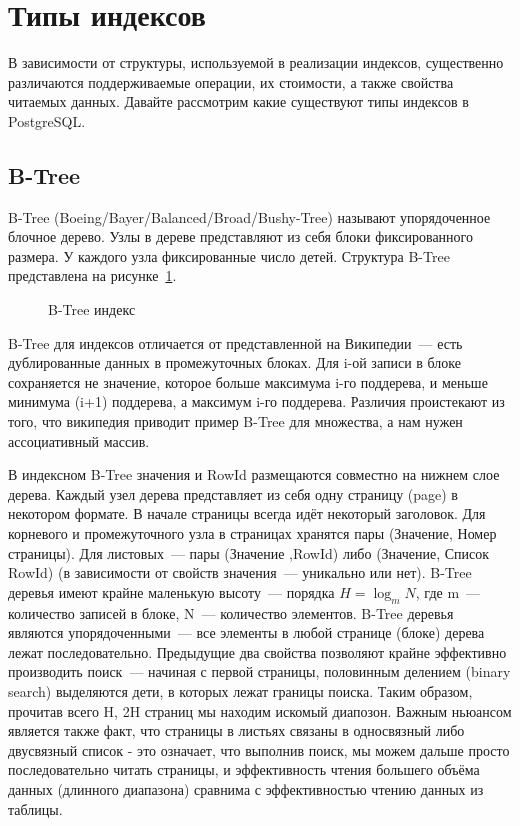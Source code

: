 \section{Типы индексов}

В зависимости от структуры, используемой в реализации индексов, существенно различаются поддерживаемые операции, их стоимости, а также свойства читаемых данных. Давайте рассмотрим какие существуют типы индексов в PostgreSQL.




\subsection{B-Tree}

B-Tree (Boeing/Bayer/Balanced/Broad/Bushy-Tree) называют упорядоченное блочное дерево. Узлы в дереве представляют из себя блоки фиксированного размера. У каждого узла фиксированные число детей. Структура B-Tree представлена на рисунке~\ref{fig:btree_index}.

\begin{figure}[ht!]
  \caption{B-Tree индекс}
  \label{fig:btree_index}
\end{figure}

B-Tree для индексов отличается от представленной на Википедии~--- есть дублированные данных в промежуточных блоках. Для i-ой записи в блоке сохраняется не значение, которое больше максимума i-го поддерева, и меньше минимума (i+1) поддерева, а максимум i-го поддерева. Различия проистекают из того, что википедия приводит пример B-Tree для множества, а нам нужен ассоциативный массив.

В индексном B-Tree значения и RowId размещаются совместно на нижнем слое дерева. Каждый узел дерева представляет из себя одну страницу (page) в некотором формате. В начале страницы всегда идёт некоторый заголовок. Для корневого и промежуточного узла в страницах хранятся пары (Значение, Номер страницы). Для листовых~--- пары (Значение ,RowId) либо (Значение, Список RowId) (в зависимости от свойств значения~--- уникально или нет). B-Tree деревья имеют крайне маленькую высоту~--- порядка $H = \log_m{N}$, где m~--- количество записей в блоке, N~--- количество элементов. B-Tree деревья являются упорядоченными~--- все элементы в любой странице (блоке) дерева лежат последовательно. Предыдущие два свойства позволяют крайне эффективно производить поиск~--- начиная с первой страницы, половинным делением (binary search) выделяются дети, в которых лежат границы поиска. Таким образом, прочитав всего H, 2H страниц мы находим искомый диапозон. Важным ньюансом является также факт, что страницы в листьях связаны в односвязный либо двусвязный список - это означает, что выполнив поиск, мы можем дальше просто последовательно читать страницы, и эффективность чтения большего объёма данных (длинного диапазона) сравнима с эффективностью чтению данных из таблицы.

